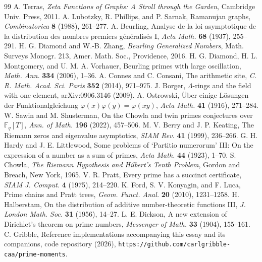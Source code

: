\documentclass[11pt]{article}
\theoremstyle{remark}
\begin{document}
\begin{thebibliography}{99}
 A. Terras, \emph{Zeta Functions of Graphs: A Stroll through the Garden},
Cambridge Univ. Press, 2011.
 A. Lubotzky, R. Phillips, and P. Sarnak, Ramanujan graphs, \emph{Combinatorica}
\textbf{8} (1988), 261--277.
 A. Beurling, Analyse de la loi asymptotique de la distribution des nombres
premiers g\'en\'eralis\'es I, \emph{Acta Math.} \textbf{68} (1937), 255--291.
 H. G. Diamond and W.-B. Zhang, \emph{Beurling Generalized Numbers}, Math.
Surveys Monogr. 213, Amer. Math. Soc., Providence, 2016.
 H. G. Diamond, H. L. Montgomery, and U. M. A. Vorhauer, Beurling primes with large
oscillation, \emph{Math. Ann.} \textbf{334} (2006), 1--36.
 A. Connes and C. Consani, The arithmetic site, \emph{C. R. Math. Acad. Sci.
Paris} \textbf{352} (2014), 971--975.
 J. Borger, $\Lambda$-rings and the field with one element, arXiv:0906.3146
(2009).
 A. Ostrowski, \"Uber einige L\"osungen der Funktionalgleichung
$\varphi(x)\varphi(y) = \varphi(xy)$, \emph{Acta Math.} \textbf{41} (1916), 271--284.
 W. Sawin and M. Shusterman, On the Chowla and twin primes conjectures over
$\mathbb{F}_q[T]$, \emph{Ann. of Math.} \textbf{196} (2022), 457--506.
 M. V. Berry and J. P. Keating, The Riemann zeros and eigenvalue asymptotics,
\emph{SIAM Rev.} \textbf{41} (1999), 236--266.
 G. H. Hardy and J. E. Littlewood, Some problems of `Partitio
numerorum' III: On the expression of a number as a sum of primes, \emph{Acta Math.} \textbf{44}
(1923), 1--70.
 S. Chowla, \emph{The Riemann Hypothesis and Hilbert's Tenth Problem}, Gordon and
Breach, New York, 1965.
 V. R. Pratt, Every prime has a succinct certificate, \emph{SIAM J. Comput.}
\textbf{4} (1975), 214--220.
 K. Ford, S. V. Konyagin, and F. Luca, Prime chains and Pratt trees, \emph{Geom.
Funct. Anal.} \textbf{20} (2010), 1231--1258.
 H. Halberstam, On the distribution of additive number-theoretic functions III,
\emph{J. London Math. Soc.} \textbf{31} (1956), 14--27.
 L. E. Dickson, A new extension of Dirichlet's theorem on prime numbers,
\emph{Messenger of Math.} \textbf{33} (1904), 155--161.
 C. Gribble, Reference implementations accompanying this essay and its companions, code
repository (2026), \texttt{https://github.com/carlgribble-caa/prime-moments}.
\end{thebibliography}
\end{document}
